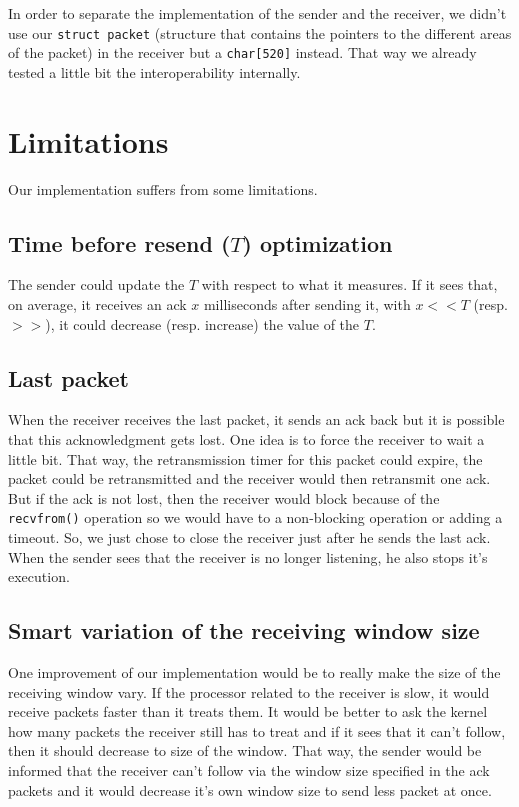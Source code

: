 \documentclass[10pt,a4paper]{article}
\begin{document}
In order to separate the implementation of the sender and the receiver, we didn't use our \lstinline|struct packet| (structure that contains the pointers to the different areas of the packet) in the receiver but a \lstinline|char[520]| instead. That way we already tested a little bit the interoperability internally.

\section{Limitations}

Our implementation suffers from some limitations.

\subsection{Time before resend ($T$) optimization} The sender could update the $T$ with respect to what it measures. If it sees that, on average, it receives an ack $x$ milliseconds after sending it, with $x << T$ (resp. $>>$), it could decrease (resp. increase) the value of the $T$.

\subsection{Last packet}
When the receiver receives the last packet, it sends an ack back but it is possible that this acknowledgment gets lost. One idea is to force the receiver to wait a little bit. That way, the retransmission timer for this packet could expire, the packet could be retransmitted and the receiver would then retransmit one ack. But if the ack is not lost, then the receiver would block because of the \texttt{recvfrom()} operation so we would have to a non-blocking operation or adding a timeout. So, we just chose to close the receiver just after he sends the last ack. When the sender sees that the receiver is no longer listening, he also stops it's execution.

\subsection{Smart variation of the receiving window size}
One improvement of our implementation would be to really make the size of the receiving window vary. If the processor related to the receiver is slow, it would receive packets faster than it treats them. It would be better to ask the kernel how many packets the receiver still has to treat and if it sees that it can't follow, then it should decrease to size of the window. That way, the sender would be informed that the receiver can't follow via the window size specified in the ack packets and it would decrease it's own window size to send less packet at once.
\end{document}
